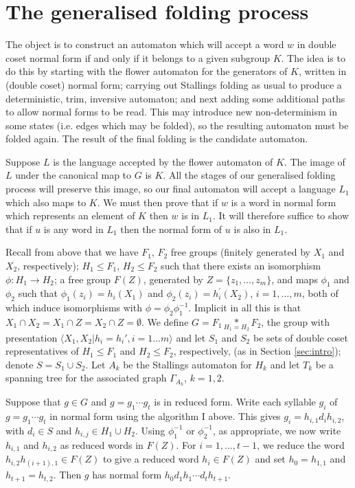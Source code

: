 \documentclass[a4paper,12pt]{article}
\newcommand{\G}{\Gamma }
\newcommand{\nul}{\emptyset }
\numberwithin{equation}{section}
\numberwithin{figure}{section}
\newcommand{\la}{\langle}
\newcommand{\ra}{\rangle}
\begin{document}
%
%
\section{The generalised folding process}\label{sec:foldings}
The object is to construct an automaton which will accept a word
$w$ in double coset normal form if and only if it belongs to a
given subgroup $K$. The idea is to do this by starting with the
flower automaton for the generators of $K$, written in (double
coset) normal form; carrying out Stallings folding as usual to
produce a deterministic, trim, inversive automaton; and next
adding some additional paths to allow normal forms to be read.
This may introduce new non-determinism in some  states (i.e. edges
which may be folded), so the resulting automaton must be folded
again. The result of the final folding is the candidate automaton.

 Suppose $L$ is the
language accepted by the flower automaton of $K$. The image of $L$ under
the canonical map to $G$ is $K$. All the stages of our generalised folding
process will preserve this image, so our final automaton will accept a language
$L_1$ which also maps to $K$. We must then prove that if $w$ is a word
in normal form which represents an element of $K$ then $w$ is in $L_1$. It will
therefore suffice to show that if $u$ is any word in $L_1$ then the
normal form of $u$ is also in $L_1$.

Recall from above that we have $F_1$, $F_2$ free groups (finitely
generated by $X_1$ and $X_2$, respectively);
 $H_1 \leq F_1$, $H_2 \leq F_2$ such that
there exists an isomorphism $\phi: H_1 \rightarrow H_2$; a free group
 $F(Z)$, generated by $Z=\{z_1, \ldots, z_m\}$,
and  maps $\phi_1$ and $\phi_2$ such that $\phi_1(z_i)=h_i(X_1)  $
and  $\phi_2(z_i)=h^\prime_i(X_2)$, $i=1,\ldots ,m$, both of which
induce isomorphisms with $\phi=\phi_2\phi_1^{-1}$. Implicit in all
this is that $X_1\cap X_2=X_1\cap Z = X_2\cap Z=\nul$. We define
${G = F_1 \underset{H_1=H_2}{\ast} F_2}$, the group with
 presentation $\la X_1,X_2 | h_i = h_i', i=1 \ldots m\ra$ and
let $S_1$ and $S_2$ be sets of  double coset representatives of
$H_1\le F_1$ and $H_2\le F_2$, respectively, (as in Section
\ref{sec:intro}); denote $S= S_1 \cup S_2$. Let $A_k$ be the
Stallings automaton for $H_k$ and let $T_k$ be a spanning tree for
the associated graph $\G_{A_k}$, $k=1,2$.

Suppose that $g \in G$ and $g=g_1\cdots g_t$ is in reduced form.
Write each syllable $g_i$ of $g=g_1\cdots g_t$ in normal form
using the algorithm I above. This gives
$g_i=h_{i,1}d_ih_{i,2}$, with $d_i\in S$ and $h_{i,j}\in H_1\cup
H_2$. Using $\phi_1^{-1}$ or $\phi_2^{-1}$, as appropriate, we now
write $h_{i,1}$ and $h_{i,2}$ as reduced words in $F(Z)$. For
$i=1,\ldots , t-1$, we reduce the word $h_{i,2}h_{(i+1),1}\in
F(Z)$ to give a reduced word $h_i\in F(Z)$ and set $h_0=h_{1,1}$
and  $h_{t+1}=h_{t,2}$. Then $g$ has normal form $h_0d_1h_1\cdots
d_th_{t+1}$.
\end{document}
